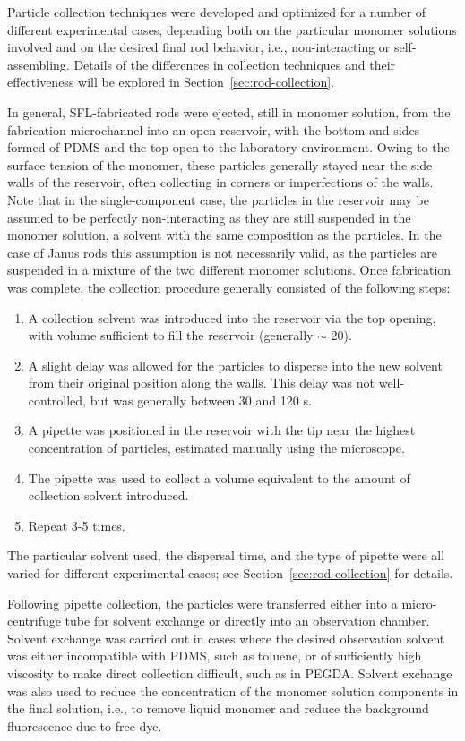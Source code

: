 Particle collection techniques were developed and optimized for a number of different experimental cases,
depending both on the particular monomer solutions involved and on the desired final rod behavior, i.e., 
non-interacting or self-assembling.  Details of the differences
in collection techniques and their effectiveness will be explored in Section~\ref{sec:rod-collection}.

In general, SFL-fabricated rods were ejected, still in monomer solution, from the fabrication microchannel into 
an open reservoir, with the bottom and sides formed of PDMS and the top open to the 
laboratory environment.  Owing to the
surface tension of the monomer, these particles generally stayed near the side walls of the reservoir, often
collecting in corners or imperfections of the walls.  Note that in the single-component case, the particles in
the reservoir may be assumed to be perfectly non-interacting as they are still suspended in the monomer solution, 
a solvent with the
same composition as the particles.   In the case of Janus rods this assumption is not necessarily valid, as
the particles are suspended in a mixture of the two different monomer solutions.  Once fabrication 
was complete, the collection procedure generally consisted of the following steps:

\begin{enumerate}
\item A collection solvent was introduced into the reservoir via the top opening, with volume sufficient to
fill the reservoir (generally $\sim$ 20\uL).
\item A slight delay was allowed for the particles to disperse into the new solvent from their 
original position along the 
walls. This delay was not well-controlled, but was generally between 30 and 120 s.
\item A pipette was positioned in the reservoir with the tip near the highest concentration of particles, estimated
manually using the microscope.
\item The pipette was used to collect a volume equivalent to the amount of collection solvent introduced.
\item Repeat 3-5 times.
\end{enumerate}

The particular solvent used, the dispersal time, and the type of pipette were all varied for different experimental
cases; see Section~\ref{sec:rod-collection} for details.

Following pipette collection, the particles were transferred either  into a micro-centrifuge tube for solvent 
exchange or directly into an observation chamber.  Solvent exchange was carried out in cases where the desired
observation solvent was either incompatible with PDMS, such as toluene, or of sufficiently high viscosity to make
direct collection difficult, such as in PEGDA.  Solvent exchange was also used to reduce
the concentration of the monomer solution components in the final solution, i.e., to remove liquid monomer and 
reduce the background fluorescence due to free dye.


